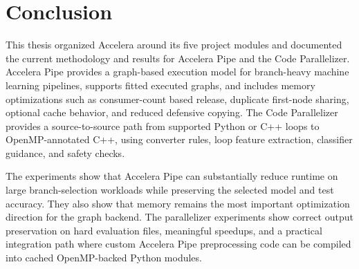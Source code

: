 \documentclass[11pt,a4paper]{article}
\newcommand{\project}{Accelera}
\begin{document}
\vspace{2em}

\section{Conclusion}

This thesis organized \project{} around its five project modules and documented
the current methodology and results for Accelera Pipe and the Code
Parallelizer. Accelera Pipe provides a graph-based execution model for
branch-heavy machine learning pipelines, supports fitted executed graphs, and
includes memory optimizations such as consumer-count based release, duplicate
first-node sharing, optional cache behavior, and reduced defensive copying.
The Code Parallelizer provides a source-to-source path from supported Python or
C++ loops to OpenMP-annotated C++, using converter rules, loop feature
extraction, classifier guidance, and safety checks.

The experiments show that Accelera Pipe can substantially reduce runtime on
large branch-selection workloads while preserving the selected model and test
accuracy. They also show that memory remains the most important optimization
direction for the graph backend. The parallelizer experiments show correct
output preservation on hard evaluation files, meaningful speedups, and a
practical integration path where custom Accelera Pipe preprocessing code can be
compiled into cached OpenMP-backed Python modules.
\end{document}

